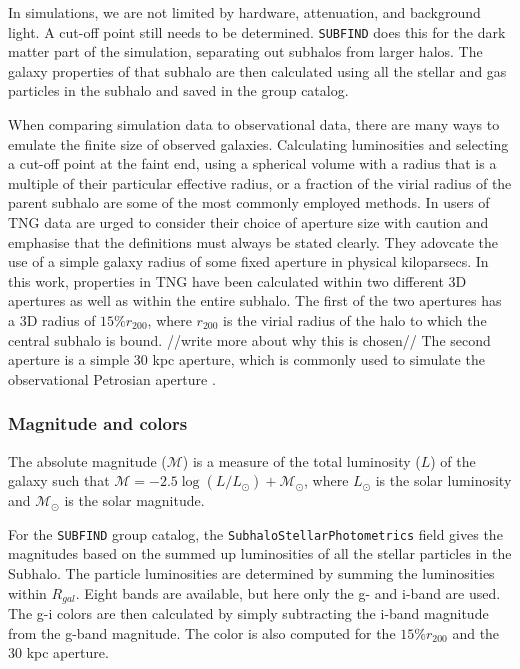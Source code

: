 In simulations, we are not limited by hardware, attenuation, and background light. A cut-off point still needs to be determined. \texttt{SUBFIND} does this for the dark matter part of the simulation, separating out subhalos from larger halos. The galaxy properties of that subhalo are then calculated using all the stellar and gas particles in the subhalo and saved in the group catalog. 

When comparing simulation data to observational data, there are many ways to emulate the finite size of observed galaxies. Calculating luminosities and selecting a cut-off point at the faint end, using a spherical volume with a radius that is a multiple of their particular effective radius, or a fraction of the virial radius of the parent subhalo are some of the most commonly employed methods. In \textcite{Pillepich2017} users of TNG data are urged to consider their choice of aperture size with caution and emphasise that the definitions must always be stated clearly. They adovcate the use of a simple galaxy radius of some fixed aperture in physical kiloparsecs. In this work, properties in TNG have been calculated within two different 3D apertures as well as within the entire subhalo. The first of the two apertures has a 3D radius of $15 \% r_{200}$, where $r_{200}$ is the virial radius of the halo to which the central subhalo is bound. //write more about why this is chosen// The second aperture is a simple 30 kpc aperture, which is commonly used to simulate the observational Petrosian aperture \parencite{Schaye2015}.

\subsubsection{Magnitude and colors}

The absolute magnitude ($\mathcal{M}$) is a measure of the total luminosity ($L$) of the galaxy such that $\mathcal{M} = -2.5 \log(L/L_\odot) + \mathcal{M}_\odot$, where $L_\odot$ is the solar luminosity and $\mathcal{M}_\odot$ is the solar magnitude.

For the \texttt{SUBFIND} group catalog, the \texttt{SubhaloStellarPhotometrics} field gives the magnitudes based on the summed up luminosities of all the stellar particles in the Subhalo. The particle luminosities are determined by summing the luminosities within $R_{gal}$. Eight bands are available, but here only the g- and i-band are used. The g-i colors are then calculated by simply subtracting the i-band magnitude from the g-band magnitude. The color is also computed for the $15 \% r_{200}$ and the 30 kpc aperture.

